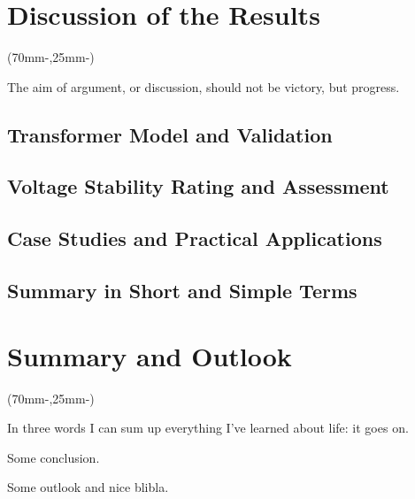 

\chapter{Discussion of the Results}
\label{chap:discussion}

\begin{textblock*}{.7\textwidth}(70mm-\offset,25mm-\offset)
    \begin{fquote}
        The aim of argument, or discussion, should not be victory, but progress.
    \end{fquote}
\end{textblock*}

\section{Transformer Model and Validation}

\section{Voltage Stability Rating and Assessment}

\section{Case Studies and Practical Applications}

\section{Summary in Short and Simple Terms}

\chapter{Summary and Outlook}
\label{chap:summary}

\begin{textblock*}{.7\textwidth}(70mm-\offset,25mm-\offset)
    \begin{fquote}
        In three words I can sum up everything I've learned about life: it goes on.
    \end{fquote}
\end{textblock*}

Some conclusion.

Some outlook and nice blibla.